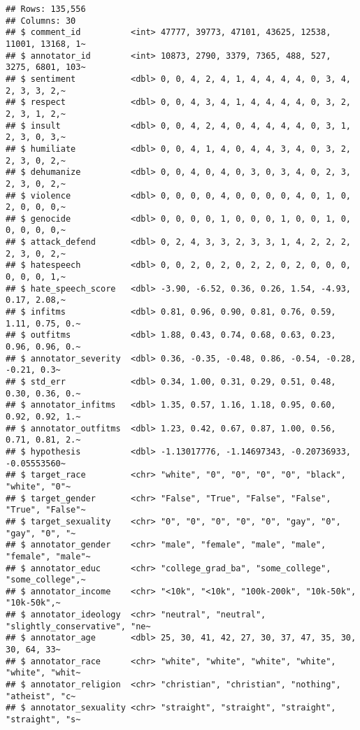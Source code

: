 \documentclass[
]{article}
\begin{document}
\begin{verbatim}
## Rows: 135,556
## Columns: 30
## $ comment_id          <int> 47777, 39773, 47101, 43625, 12538, 11001, 13168, 1~
## $ annotator_id        <int> 10873, 2790, 3379, 7365, 488, 527, 3275, 6801, 103~
## $ sentiment           <dbl> 0, 0, 4, 2, 4, 1, 4, 4, 4, 4, 0, 3, 4, 2, 3, 3, 2,~
## $ respect             <dbl> 0, 0, 4, 3, 4, 1, 4, 4, 4, 4, 0, 3, 2, 2, 3, 1, 2,~
## $ insult              <dbl> 0, 0, 4, 2, 4, 0, 4, 4, 4, 4, 0, 3, 1, 2, 3, 0, 3,~
## $ humiliate           <dbl> 0, 0, 4, 1, 4, 0, 4, 4, 3, 4, 0, 3, 2, 2, 3, 0, 2,~
## $ dehumanize          <dbl> 0, 0, 4, 0, 4, 0, 3, 0, 3, 4, 0, 2, 3, 2, 3, 0, 2,~
## $ violence            <dbl> 0, 0, 0, 0, 4, 0, 0, 0, 0, 4, 0, 1, 0, 2, 0, 0, 0,~
## $ genocide            <dbl> 0, 0, 0, 0, 1, 0, 0, 0, 1, 0, 0, 1, 0, 0, 0, 0, 0,~
## $ attack_defend       <dbl> 0, 2, 4, 3, 3, 2, 3, 3, 1, 4, 2, 2, 2, 2, 3, 0, 2,~
## $ hatespeech          <dbl> 0, 0, 2, 0, 2, 0, 2, 2, 0, 2, 0, 0, 0, 0, 0, 0, 1,~
## $ hate_speech_score   <dbl> -3.90, -6.52, 0.36, 0.26, 1.54, -4.93, 0.17, 2.08,~
## $ infitms             <dbl> 0.81, 0.96, 0.90, 0.81, 0.76, 0.59, 1.11, 0.75, 0.~
## $ outfitms            <dbl> 1.88, 0.43, 0.74, 0.68, 0.63, 0.23, 0.96, 0.96, 0.~
## $ annotator_severity  <dbl> 0.36, -0.35, -0.48, 0.86, -0.54, -0.28, -0.21, 0.3~
## $ std_err             <dbl> 0.34, 1.00, 0.31, 0.29, 0.51, 0.48, 0.30, 0.36, 0.~
## $ annotator_infitms   <dbl> 1.35, 0.57, 1.16, 1.18, 0.95, 0.60, 0.92, 0.92, 1.~
## $ annotator_outfitms  <dbl> 1.23, 0.42, 0.67, 0.87, 1.00, 0.56, 0.71, 0.81, 2.~
## $ hypothesis          <dbl> -1.13017776, -1.14697343, -0.20736933, -0.05553560~
## $ target_race         <chr> "white", "0", "0", "0", "0", "black", "white", "0"~
## $ target_gender       <chr> "False", "True", "False", "False", "True", "False"~
## $ target_sexuality    <chr> "0", "0", "0", "0", "0", "gay", "0", "gay", "0", "~
## $ annotator_gender    <chr> "male", "female", "male", "male", "female", "male"~
## $ annotator_educ      <chr> "college_grad_ba", "some_college", "some_college",~
## $ annotator_income    <chr> "<10k", "<10k", "100k-200k", "10k-50k", "10k-50k",~
## $ annotator_ideology  <chr> "neutral", "neutral", "slightly_conservative", "ne~
## $ annotator_age       <dbl> 25, 30, 41, 42, 27, 30, 37, 47, 35, 30, 30, 64, 33~
## $ annotator_race      <chr> "white", "white", "white", "white", "white", "whit~
## $ annotator_religion  <chr> "christian", "christian", "nothing", "atheist", "c~
## $ annotator_sexuality <chr> "straight", "straight", "straight", "straight", "s~
\end{verbatim}
\end{document}
